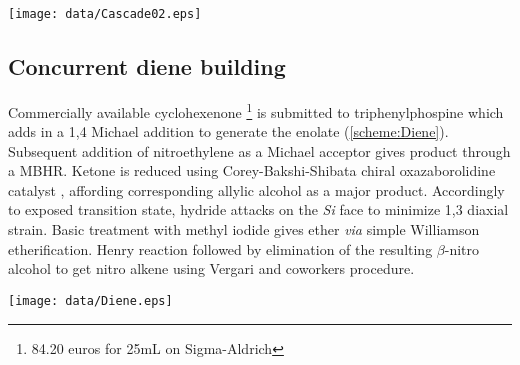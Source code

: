 \newpage
\begin{figure''}
\centering
		\texttt{[image: data/Cascade02.eps]}	
    \label{scheme:Cascade02}
\end{figure''}
\subsection*{Concurrent diene building}
Commercially available cyclohexenone \footnote{84.20 euros for 25mL on Sigma-Aldrich} is submitted to triphenylphospine which adds in a 1,4 Michael addition to generate the enolate (\ref{scheme:Diene}). Subsequent addition of nitroethylene as a Michael acceptor gives product  through a MBHR\autocite{Morita68}. Ketone  is reduced using Corey-Bakshi-Shibata chiral oxazaborolidine catalyst \autocite{Corey87}, affording corresponding allylic alcohol  as a major product. Accordingly to exposed transition state, hydride attacks on the \textit{Si} face to minimize 1,3 diaxial strain. Basic treatment with methyl iodide gives ether  \textit{via} simple Williamson etherification. Henry reaction followed by elimination of the resulting $\beta$-nitro alcohol to get nitro alkene  using Vergari and coworkers procedure\autocite{Vergari08}.
\newpage
\begin{figure''}
\centering
		\texttt{[image: data/Diene.eps]}	
    \label{scheme:Diene}
\end{figure''}
